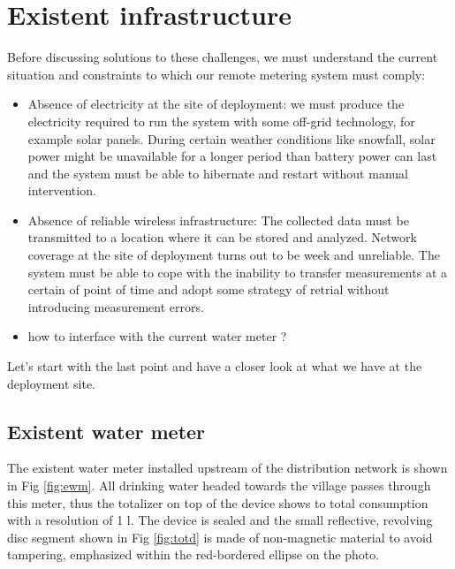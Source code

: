 \chapter{Existent infrastructure}

Before discussing solutions to these challenges, we must understand the current situation and constraints to which our
remote metering system must comply:

\begin{itemize}
    \item Absence of electricity at the site of deployment: we must produce the electricity required to run the system with some off-grid technology,
          for example solar panels. During certain weather conditions like snowfall, solar power might be unavailable for a longer period
          than battery power can last and the system
          must be able to hibernate and restart without manual intervention.
    \item Absence of reliable wireless infrastructure: The collected data must be transmitted to a location where
          it can be stored and analyzed. Network coverage at the site of deployment turns out to be week and
          unreliable.  The system must be able to cope with the inability to transfer measurements at a certain of point of  time
          and adopt some strategy of retrial without introducing measurement errors.
    \item how to interface with the current water meter ?
\end{itemize}

Let's start with the last point and have a closer look at what we have at the deployment site.

\section{Existent water meter}

The existent water meter installed upstream of the distribution network is shown in Fig \ref{fig:ewm}.
All drinking water headed towards the village passes through this meter, thus the totalizer on top of
the device shows to total consumption with a resolution of 1 l. The device is sealed and
the small reflective, revolving disc segment shown in Fig \ref{fig:totd} is made of non-magnetic material to avoid tampering,
emphasized within the red-bordered ellipse on the photo.

